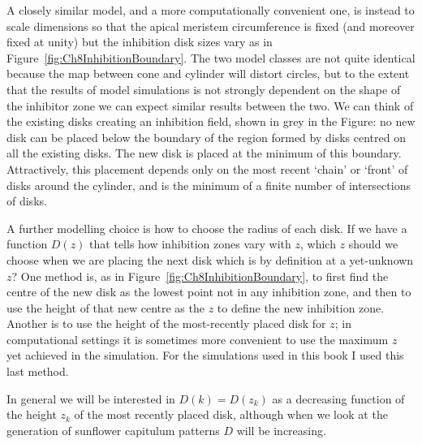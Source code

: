 A closely similar model, and a more computationally convenient one, is instead to scale dimensions so that the apical meristem circumference is fixed (and moreover fixed at unity) but the inhibition disk sizes vary as in Figure~\ref{fig:Ch8InhibitionBoundary}. The two model classes are not quite identical because the map between cone and cylinder will distort circles, but to the extent that the results of model simulations is not strongly dependent on the shape of the inhibitor zone we can expect similar results between the two.
 We can 
think of the existing disks creating an inhibition field, shown in grey in the Figure: no new disk can be placed below the boundary of the region formed by disks centred on all the existing disks. The new disk is placed at the minimum of this boundary.  Attractively, this placement depends only on the most recent `chain' or `front' of disks around the cylinder, and is the minimum of a finite number of intersections of disks. 

\clearpage
{}

A further modelling choice is how to choose the radius of each disk. If we have a function $D(z)$ that tells how inhibition zones vary with $z$, which $z$ should we choose when we are placing the next disk which is by definition at a yet-unknown $z$?  One method is, as in Figure~\ref{fig:Ch8InhibitionBoundary}, to first find the centre of the new disk as the lowest point not in any inhibition zone, and then to use the height of that new centre as the $z$ to define the new inhibition zone. Another is to use the height of the most-recently placed disk for $z$; in computational settings it is sometimes more convenient to use the maximum $z$ yet achieved in the simulation. For the simulations used in this book I used this last method.

In general we will be interested in $D(k)=D(z_k)$ as a decreasing function of the height $z_k$ of the most recently placed disk, although when we look at the generation of sunflower capitulum patterns $D$ will be increasing. 

\clearpage
